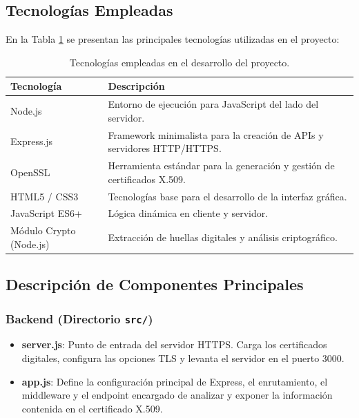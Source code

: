 \subsection{Tecnologías Empleadas}

En la Tabla \ref{tabla:tecnologias} se presentan las principales tecnologías utilizadas en el proyecto:

\begin{table}[H]
\centering
\begin{tabularx}{\textwidth}{lX}
\textbf{Tecnología} & \textbf{Descripción} \\
\hline
Node.js & Entorno de ejecución para JavaScript del lado del servidor. \\
Express.js & Framework minimalista para la creación de APIs y servidores HTTP/HTTPS. \\
OpenSSL & Herramienta estándar para la generación y gestión de certificados X.509. \\
HTML5 / CSS3 & Tecnologías base para el desarrollo de la interfaz gráfica. \\
JavaScript ES6+ & Lógica dinámica en cliente y servidor. \\
Módulo Crypto (Node.js) & Extracción de huellas digitales y análisis criptográfico. \\
\end{tabularx}
\caption{Tecnologías empleadas en el desarrollo del proyecto.}
\label{tabla:tecnologias}
\end{table}

\subsection{Descripción de Componentes Principales}

\subsubsection*{Backend (Directorio \texttt{src/})}

\begin{itemize}
    \item \textbf{server.js}: Punto de entrada del servidor HTTPS.  
    Carga los certificados digitales, configura las opciones TLS y levanta el servidor en el puerto 3000.
    \item \textbf{app.js}: Define la configuración principal de Express, el enrutamiento, el middleware y el endpoint encargado de analizar y exponer la información contenida en el certificado X.509.
\end{itemize}

